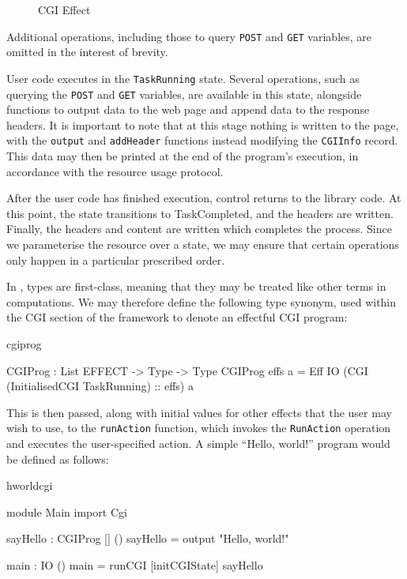 \begin{figure*}[t]
\begin{center}
\end{center}
\caption{CGI Effect}
\label{fig:cgieffect}
\end{figure*}

Additional operations, including those to query \texttt{POST} and \texttt{GET}
variables, are omitted in the interest of brevity.

User code executes in the \texttt{TaskRunning} state. Several operations, such
as querying the \texttt{POST} and \texttt{GET} variables, are available in this state, alongside
functions to output data to the web page and append data to the response
headers. It is important to note that at this stage nothing is written to the
page, with the \texttt{output} and \texttt{addHeader} functions instead
modifying the \texttt{CGIInfo} record. This data may then be printed at the end of the
program's execution, in accordance with the resource usage protocol.

After the user code has finished execution, control returns to the library
code. At this point, the state transitions to TaskCompleted, and the headers
are written.  Finally, the headers and content are written which completes the
process. Since we parameterise the resource over a state, we may ensure that
certain operations only happen in a particular prescribed order.

In \idris{}, types are first-class, meaning that they may be treated like other
terms in computations. We may therefore define the following type synonym, used
within the CGI section of the framework to denote an effectful CGI program: 

\begin{SaveVerbatim}{cgiprog}

CGIProg : List EFFECT -> Type -> Type
CGIProg effs a = 
  Eff IO (CGI (InitialisedCGI TaskRunning) :: effs) a

\end{SaveVerbatim}

\noindent
This is then passed, along with initial values for other effects that the user
may wish to use, to the \texttt{runAction} function, which invokes the \texttt{RunAction}
operation and executes the user-specified action.
%
A simple ``Hello, world!'' program would be defined as follows:

\begin{SaveVerbatim}{hworldcgi}

module Main
import Cgi

sayHello : CGIProg [] ()
sayHello = output "Hello, world!"

main : IO ()
main = runCGI [initCGIState] sayHello

\end{SaveVerbatim}

